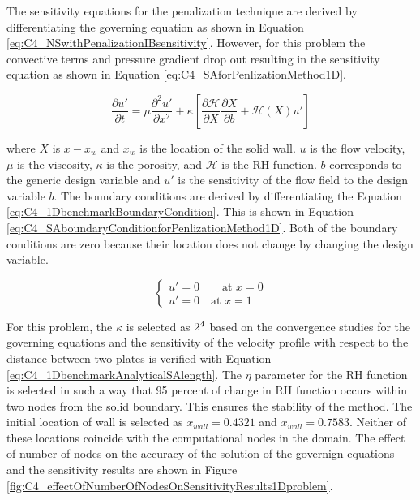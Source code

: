 The sensitivity equations for the penalization technique are derived by differentiating the governing equation as shown in Equation \eqref{eq:C4_NSwithPenalizationIBsensitivity}. However, for this problem the convective terms and pressure gradient drop out resulting in the sensitivity equation as shown in Equation \eqref{eq:C4_SAforPenlizationMethod1D}.

\begin{equation}\label{eq:C4_SAforPenlizationMethod1D}
	\frac{\partial u'}{\partial t} = 
	\mu \frac{\partial^2 u'}{\partial x^2} +
	\kappa \left[
	\frac{\partial \mathcal{H}}{\partial X} \frac{\partial X}{\partial b} + 
	\mathcal{H}(X) u'
	\right]
\end{equation}

where $X$ is $x - x_w$ and $x_w$ is the location of the solid wall. $u$ is the flow velocity, $\mu$ is the viscosity, $\kappa$ is the porosity, and $\mathcal{H}$ is the RH function. $b$ corresponds to the generic design variable and $u'$ is the sensitivity of the flow field to the design variable $b$. The boundary conditions are derived by differentiating the Equation \eqref{eq:C4_1DbenchmarkBoundaryCondition}. This is shown in Equation \eqref{eq:C4_SAboundaryConditionforPenlizationMethod1D}. Both of the boundary conditions are zero because their location does not change by changing the design variable.

\begin{equation}\label{eq:C4_SAboundaryConditionforPenlizationMethod1D}
\begin{cases}
	u' = 0 \qquad \text{at } x = 0 \\
	u' = 0 \quad \text{at } x = 1
\end{cases}
\end{equation}

For this problem, the $\kappa$ is selected as $2 \time 10^4$ based on the convergence studies for the governing equations and the sensitivity of the velocity profile with respect to the distance between two plates is verified with Equation \eqref{eq:C4_1DbenchmarkAnalyticalSAlength}. The $\eta$ parameter for the RH function is selected in such a way that 95 percent of change in RH function occurs within two nodes from the solid boundary. This ensures the stability of the method. The initial location of wall is selected as $x_{wall} = 0.4321$ and $x_{wall} = 0.7583$. Neither of these locations coincide with the computational nodes in the domain. The effect of number of nodes on the accuracy of the solution of the governign equations and the sensitivity results are shown in Figure \ref{fig:C4_effectOfNumberOfNodesOnSensitivityResults1Dproblem}.


